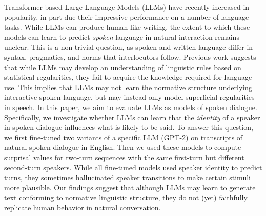
Transformer-based Large Language Models (LLMs) have recently increased in popularity, in part due their impressive performance on a number of language tasks. While LLMs can produce human-like writing, the extent to which these models can learn to predict \emph{spoken} language in natural interaction remains unclear. This is a non-trivial question, as spoken and written language differ in syntax, pragmatics, and norms that interlocutors follow. Previous work suggests that while LLMs may develop an understanding of linguistic rules based on statistical regularities, they fail to acquire the knowledge required for language use. This implies that LLMs may not learn the normative structure underlying interactive spoken language, but may instead only model superficial regularities in speech. In this paper, we aim to evaluate LLMs as models of spoken dialogue. Specifically, we investigate whether LLMs can learn that the \emph{identity} of a speaker in spoken dialogue influences what is likely to be said. To answer this question, we first fine-tuned two variants of a specific LLM (GPT-2) on transcripts of natural spoken dialogue in English. Then we used these models to compute surprisal values for two-turn sequences with the same first-turn but different second-turn speakers. While all fine-tuned models used speaker identity to predict turns, they sometimes hallucinated speaker transitions to make certain stimuli more plausible. Our findings suggest that although LLMs may learn to generate text conforming to normative linguistic structure, they do not (yet) faithfully replicate human behavior in natural conversation.
